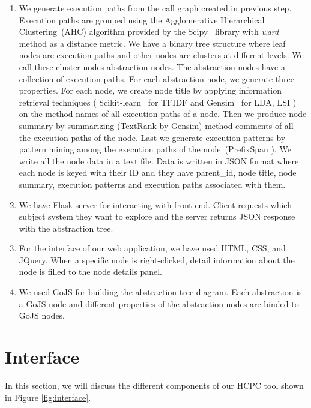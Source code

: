 \begin{enumerate}
    \item We generate execution paths from the call graph created in previous step.
Execution paths are grouped using the Agglomerative Hierarchical Clustering~(AHC) algorithm provided by the Scipy~\cite{scipy} library with \emph{ward} method as a  distance metric. We have a binary tree structure where leaf nodes are execution paths and other nodes are clusters at different levels. We call these cluster nodes abstraction nodes. The abstraction nodes have a collection of execution paths. For each abstraction node, we generate three properties. For each node, we create node title by applying information retrieval techniques ( Scikit-learn~\cite{scikit-learn} for TFIDF and Gensim~\cite{gensim} for LDA, LSI ) on the method names of all execution paths of a node. Then we produce node summary by summarizing (TextRank by Gensim) method comments of all the execution paths of the node. Last we generate execution patterns by pattern mining among the execution paths of the node~(PrefixSpan \cite{prefixspan}). We write all the node data in a text file. Data is written in JSON format where each node is keyed with their ID and they have parent\_id, node title, node summary, execution patterns and execution paths associated with them. 
    \item We have Flask server for interacting with front-end. Client requests which subject system they want to explore and the server returns JSON response with the abstraction tree. 
    \item For the interface of our web application, we have used HTML, CSS, and JQuery. When a specific node is right-clicked, detail information about the node is filled to the node details panel.
    \item We used GoJS for building the abstraction tree diagram. Each abstraction  is a GoJS node and different properties of the abstraction nodes are binded to GoJS nodes. 

\end{enumerate}


\section{Interface}
\label{hla3:interface}
In this section, we will discuss the different components of our HCPC tool shown in Figure \ref{fig:interface}.

